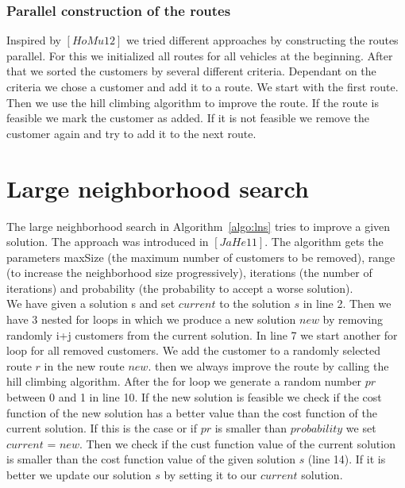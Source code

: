 \documentclass[fleqn]{scrartcl}
\begin{document}
\subsubsection{Parallel construction of the routes}
Inspired by $[HoMu 12]$ we tried different approaches by constructing the routes parallel. For this we initialized all routes for all vehicles at the beginning. After that we sorted the customers by several different criteria. Dependant on the criteria we chose a customer and add it to a route. We start with the first route. Then we use the hill climbing algorithm to improve the route. If the route is feasible we mark the customer as added. If it is not feasible we remove the customer again and try to add it to the next route. \\

\newpage
\section{Large neighborhood search}
The large neighborhood search in Algorithm~\ref{algo:lns} tries to improve a given solution. The approach was introduced in $[JaHe 11]$. The algorithm gets the parameters maxSize (the maximum number of customers to be removed), range (to increase the neighborhood size progressively), iterations (the number of iterations) and probability (the probability to accept a worse solution). \\
We have given a solution s and set $current$ to the solution $s$ in line 2. Then we have 3 nested for loops in which we produce a new solution $new$ by removing randomly i+j customers from the current solution. In line 7 we start another for loop for all removed customers. We add the customer to a randomly selected route $r$ in the new route $new$. then we always improve the route by calling the hill climbing algorithm. After the for loop we generate a random number $pr$ between 0 and 1 in line 10. If the new solution is feasible we check if the cost function of the new solution has a better value than the cost function of the current solution. If this is the case or if $pr$ is smaller than $probability$ we set $current$ = $new$. Then we check if the cust function value of the current solution is smaller than the cost function value of the given solution $s$ (line 14). If it is better we update our solution $s$ by setting it to our $current$ solution.
 
\end{document}
